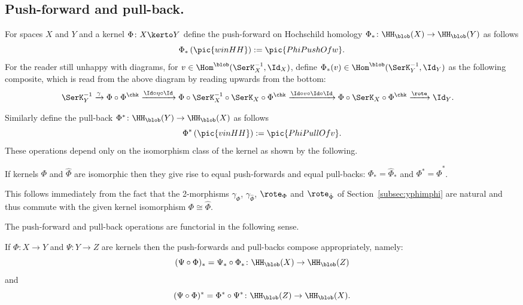  \subsection{Push-forward and pull-back.}
\label{def:defmaps}
For spaces $X$ and $Y$ and a kernel $\Phi\colon X\kerto Y$ define the
push-forward on Hochschild homology $\Phi_*\colon \HH_\blob(X)\to \HH_\blob(Y)$ as follows
\[\Phi_*\left(\pic{winHH}\right):=\pic{PhiPushOfw}.\]
For the reader still unhappy with diagrams, for $v\in
\Hom^\blob(\SerK_X^{-1},\Id_X)$, define
$\Phi_*(v)\in \Hom^\blob(\SerK_Y^{-1},\Id_Y)$ as
the following composite, which is read from the above diagram by
reading upwards from the bottom:
\begin{align*}
  \SerK^{-1}_Y
  &\xrightarrow{\gamma}
  \Phi\circ \Phi^\chk
  \xrightarrow{\Id\circ\eta\circ\Id}
  \Phi\circ\SerK_X^{-1}\circ\SerK_X\circ \Phi^\chk
  \xrightarrow{\Id\circ v\circ\Id\circ\Id} \Phi\circ\SerK_X\circ
  \Phi^\chk \xrightarrow{\rote} \Id_Y.
\end{align*}
\medskip

\noindent
Similarly define the pull-back $\Phi^*\colon \HH_\blob(Y)\to
\HH_\blob(X)$ as follows
\[\Phi^*\left(\pic{vinHH}\right):=\pic{PhiPullOfv}.\]
These operations depend only on the isomorphism class of the kernel as
shown by the following.

\begin{Proposition}
\label{prop:indepiso}
  If kernels $\Phi$ and $\hat\Phi$ are isomorphic then they give rise to
  equal push-forwards and equal pull-backs: $\Phi_*=\hat\Phi_*$ and
  $\Phi^*=\hat\Phi^*$.
\end{Proposition}

\begin{Proof}
  This follows immediately from the fact that the 2-morphisms $\gamma_\Phi$,
  $\gamma_{\hat\Phi}$, $\rote_\Phi$ and $\rote_{\hat\Phi}$ of
  Section~\ref{subsec:yphimphi} are natural and thus commute with the
  given kernel isomorphism $\Phi\cong\hat\Phi$.
\end{Proof}
\medskip

\noindent
The push-forward and pull-back operations are functorial in the
following sense.

\begin{Theorem}[Functoriality]
\label{thm:functorial}
  If $\Phi\colon X\to Y$ and $\Psi\colon Y\to Z$ are kernels then the
  push-forwards and pull-backs compose appropriately, namely:
  \[(\Psi\circ\Phi)_*=\Psi_*\circ \Phi_*\colon
  \HH_\blob(X)\to\HH_\blob(Z)\]
  and
  \[(\Psi\circ\Phi)^*=\Phi^*\circ \Psi^*\colon
  \HH_\blob(Z)\to\HH_\blob(X).\]
\end{Theorem}

